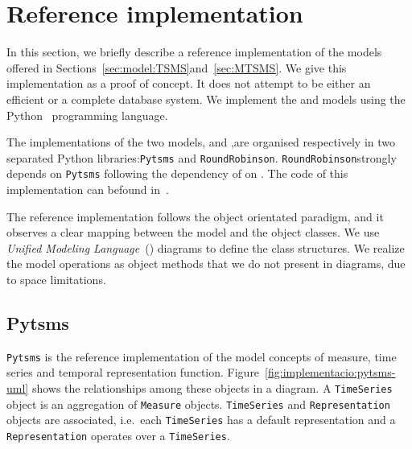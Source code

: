 \section{Reference implementation}
\label{sec:implementation}

In this section, we briefly describe a reference implementation of the
models offered in Sections~\ref{sec:model:TSMS}and~\ref{sec:MTSMS}. We
give this implementation as a proof of concept. It does not attempt to
be either an efficient or a complete database system. We implement the
 and  models using the
Python~\cite{python:doc2} programming language.

The implementations of the two models,  and
,are organised respectively in two separated Python
libraries:\texttt{Pytsms} and \texttt{RoundRobinson}.
\texttt{RoundRobinson}strongly depends on \texttt{Pytsms} following
the dependency of on .  The code of this
implementation can befound in~\cite{llusa:roundrobinson}.

The reference implementation follows the object orientated paradigm,
and it observes a clear mapping between the model and the object
classes. We use \emph{Unified Modeling Language}~() diagrams
to define the class structures. We realize the model operations as
object methods that we do not present in  diagrams, due to
space limitations.


\subsection{Pytsms}

\texttt{Pytsms} is the reference implementation of the model concepts
of measure, time series and temporal representation function.
Figure~\ref{fig:implementacio:pytsms-uml} shows the relationships
among these objects in a  diagram. A \texttt{TimeSeries}
object is an aggregation of \texttt{Measure}
objects. \texttt{TimeSeries} and \texttt{Representation} objects are
associated, i.e.\ each \texttt{TimeSeries} has a default
representation and a \texttt{Representation} operates over a
\texttt{TimeSeries}.

